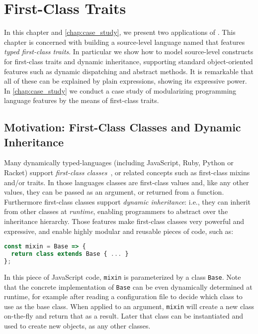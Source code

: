 \chapter{First-Class Traits}
\label{chap:traits}

\renewcommand\ottaltinferrule[4]{
  \inferrule*[narrower=0.9,lab=#1,#2]
    {#3}
    {#4}
}

In this chapter and \cref{chap:case_study}, we present two applications of
\fnamee. This chapter is concerned with building a source-level language named
\sedel that features \textit{typed first-class traits}. In particular we show
how to model source-level constructs for first-class traits and dynamic
inheritance, supporting standard object-oriented features such as dynamic
dispatching and abstract methods. It is remarkable that all of these can be
explained by plain \fnamee expressions, showing its expressive power.
In \cref{chap:case_study} we conduct a case study of modularizing programming
language features by the means of first-class traits.



\section{Motivation: First-Class Classes and Dynamic Inheritance}

Many dynamically typed-languages (including JavaScript, Ruby, Python
or Racket) support \emph{first-class classes}~\citep{DBLP:conf/aplas/FlattFF06}, or related concepts
such as first-class mixins and/or traits. In those languages classes
are first-class values and, like any other values, they can be
passed as an argument, or returned from a function. Furthermore
first-class classes support \emph{dynamic inheritance}: i.e., they
can inherit from other classes at \emph{runtime}, enabling
programmers to abstract over the inheritance hierarchy.
Those features make first-class classes very powerful and expressive,
and enable highly modular and reusable pieces of code, such as:
\begin{lstlisting}[language=JavaScript]
const mixin = Base => {
  return class extends Base { ... }
};
\end{lstlisting}
In this piece of JavaScript code, \lstinline{mixin} is
parameterized by a class \lstinline{Base}. Note that the concrete
implementation of \lstinline{Base} can be
even dynamically determined at runtime, for example
after reading a configuration file to decide which
class to use as the base class.  When applied to an argument,
\lstinline{mixin} will create a new class on-the-fly and return that
as a result. Later that class can be instantiated and used to create
new objects, as any other classes.

